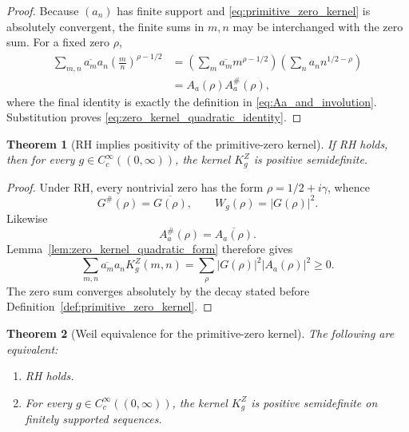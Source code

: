 \documentclass[11pt]{amsart}
\numberwithin{equation}{section}
\theoremstyle{plain}
\newtheorem{theorem}{Theorem}[section]
\theoremstyle{definition}
\theoremstyle{remark}
\begin{document}
\begin{proof}
Because \((a_n)\) has finite support and
\eqref{eq:primitive_zero_kernel} is absolutely convergent, the finite sums in
\(m,n\) may be interchanged with the zero sum.  For a fixed zero \(\rho\),
\begin{align}
\sum_{m,n}\overline{a_m}a_n
\left(\frac{m}{n}\right)^{\rho-1/2}
&=\left(\sum_m\overline{a_m}m^{\rho-1/2}\right)
\left(\sum_n a_n n^{1/2-\rho}\right)
\label{eq:zero_kernel_factorization_1}\\
&=A_a(\rho)A_a^\#(\rho),
\label{eq:zero_kernel_factorization_2}
\end{align}
where the final identity is exactly the definition in
\eqref{eq:Aa_and_involution}.  Substitution proves
\eqref{eq:zero_kernel_quadratic_identity}.
\end{proof}

\begin{theorem}[RH implies positivity of the primitive-zero kernel]
\label{thm:RH_implies_zero_kernel_positive}
If RH holds, then for every \(g\in C_c^\infty((0,\infty))\), the kernel
\(K_g^Z\) is positive semidefinite.
\end{theorem}

\begin{proof}
Under RH, every nontrivial zero has the form
\(\rho=1/2+i\gamma\), whence
\begin{equation}
G^\#(\rho)=\overline{G(\rho)},
\qquad
W_g(\rho)=|G(\rho)|^2.
\label{eq:Weil_weight_under_RH}
\end{equation}
Likewise
\begin{equation}
A_a^\#(\rho)=\overline{A_a(\rho)}.
\label{eq:Aa_under_RH}
\end{equation}
Lemma~\ref{lem:zero_kernel_quadratic_form} therefore gives
\begin{equation}
\sum_{m,n}\overline{a_m}a_nK_g^Z(m,n)
=\sum_\rho |G(\rho)|^2|A_a(\rho)|^2\ge0.
\label{eq:zero_kernel_positive_under_RH}
\end{equation}
The zero sum converges absolutely by the decay stated before
Definition~\ref{def:primitive_zero_kernel}.
\end{proof}

\begin{theorem}[Weil equivalence for the primitive-zero kernel]
\label{thm:zero_kernel_Weil_equivalence}
The following are equivalent:
\begin{enumerate}[label=(\roman*)]
\item RH holds.
\item For every \(g\in C_c^\infty((0,\infty))\), the kernel \(K_g^Z\) is
positive semidefinite on finitely supported sequences.
\end{enumerate}
\end{theorem}
\end{document}
